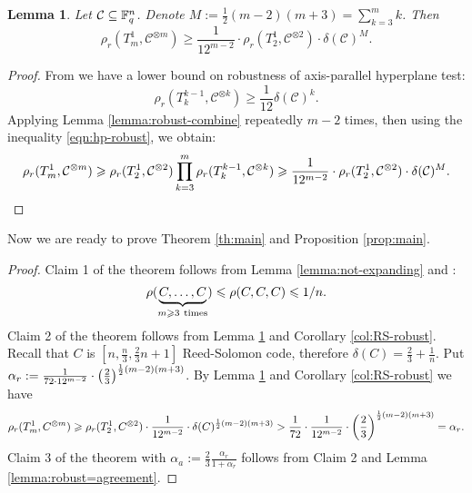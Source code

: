 \documentclass[11pt]{article}
\newtheorem{lemma}{Lemma}
\newcommand{\cC}{\mathcal{C}}
\newcommand{\cCpow}[1]{\cC^{\otimes #1}}
\begin{document}
\begin{lemma}\label{lemma:robust-Tm1}
    Let $\cC\subseteq \F_q^n$. Denote $M:=\frac12(m-2)(m+3)=\sum_{k=3}^m k$. Then \[
    \rho_r(T_m^1,\cCpow{m})\ge \frac1{12^{m-2}}\cdot\rho_r(T_2^1,\cCpow{2})\cdot\delta(\cC)^{M}.
    \]
\end{lemma}
\begin{proof}
    From \cite[Theorem 2.6]{Chiesa2020:hyperplane-robust} we have a lower bound on robustness of axis-parallel hyperplane test:
    \begin{equation}\label{eqn:hp-robust}
    \rho_r(T_k^{k-1}, \cCpow{k})\ge \frac{1}{12}\delta(\cC)^k.
    \end{equation}
    Applying Lemma \ref{lemma:robust-combine} repeatedly $m-2$ times, then using the inequality \eqref{eqn:hp-robust}, we obtain:
    \[
    \rho_r(T_m^1,\cCpow{m})\ge \rho_r(T_2^1,\cCpow{2})\prod_{k=3}^m\rho_r(T_k^{k-1},\cCpow{k})\ge \frac{1}{12^{m-2}}\cdot\rho_r(T_2^1,\cCpow{2})\cdot\delta(\cC)^{M}.\qedhere
    \]
\end{proof}
Now we are ready to prove Theorem \ref{th:main} and Proposition \ref{prop:main}.
\MainTheorem*
\begin{proof}%
    Claim 1 of the theorem follows from Lemma \ref{lemma:not-expanding} and \cite[Lemma 11]{PK2022robust}:
    \[
    \rho(\underbrace{C,\ldots,C}_{m\ge 3\ \mbox{\scriptsize\rm times}})\le \rho(C,C,C)\le 1/n.
    \]
    Claim 2 of the theorem follows from Lemma \ref{lemma:robust-Tm1} %
    and Corollary \ref{col:RS-robust}. Recall that $C$ is $[n,\frac n3,\frac23 n+1]$ Reed-Solomon code, therefore $\delta(C)=\frac23+\frac1n$. Put $\alpha_r:=\frac{1}{72\cdot 12^{m-2}}\cdot \left(\frac23\right)^{\frac12(m-2)(m+3)}$. By Lemma \ref{lemma:robust-Tm1} and Corollary \ref{col:RS-robust} we have
    \[
    \rho_r(T_m^1,C^{\otimes m})
    \geqslant \rho_r(T_2^1, C^{\otimes 2})\cdot\frac{1}{12^{m-2}}\cdot\delta(C)^{\frac12(m-2)(m+3)} 
    >\frac{1}{72}\cdot\frac{1}{12^{m-2}}\cdot\left(\frac23\right)^{\frac12(m-2)(m+3)}=\alpha_r.
    \]
    Claim 3 of the theorem with $\alpha_a:=\frac23\frac{\alpha_r}{1+\alpha_r}$ follows from Claim 2 and Lemma \ref{lemma:robust=agreement}.
\end{proof}
\end{document}
